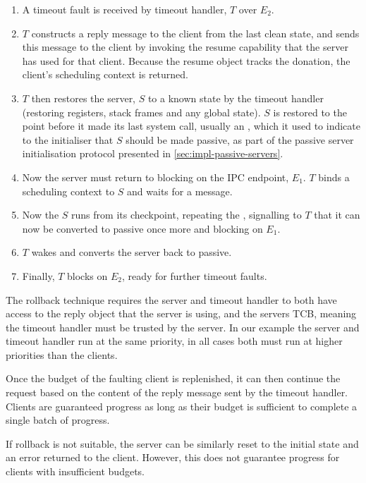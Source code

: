 \begin{enumerate}\label{e:rollback}
    \item A timeout fault is received by timeout handler, $T$ over $E_{2}$.
    \item $T$ constructs a reply message to the client from the last clean state, and sends this 
        message to the client by invoking the resume capability that the server has used for that client. 
        Because the resume object tracks the donation, the client's scheduling context is returned.
    \item $T$ then restores the server, $S$ to a known state by the timeout handler (restoring registers,
        stack frames and any global state). $S$ is restored to the point before it made its
        last system call, usually an \nbsendrecv, which it used to indicate to the initialiser that
        $S$ should be made passive, as part of the passive server initialisation protocol presented
        in \cref{sec:impl-passive-servers}.
    \item Now the server must return to blocking on the IPC endpoint, $E_{1}$. $T$ binds a
        scheduling context to $S$ and waits for a message. 
    \item Now the $S$ runs from its checkpoint, repeating the \nbsendrecv, signalling to $T$ that it
        can now be converted to passive once more and blocking on $E_{1}$. 
    \item $T$ wakes and converts the server back to passive.
    \item Finally, $T$ blocks on $E_{2}$, ready for further timeout faults.
\end{enumerate}

The rollback technique requires the server and timeout handler to both have access to the reply
object that the server is using, and the servers \gls{TCB}, meaning the timeout handler must be
trusted by the server. In our example the server and timeout handler run at the same priority, in
all cases both must run at higher priorities than the clients. 

Once the budget of the faulting client is replenished, it can then continue the request based on the
content of the reply message sent by the timeout handler. Clients are guaranteed progress as long as
their budget is sufficient to complete a single batch of progress.

If rollback is not suitable, the server can be similarly reset to the initial state and an error
returned to the client. However, this does not guarantee progress for clients with insufficient
budgets.

